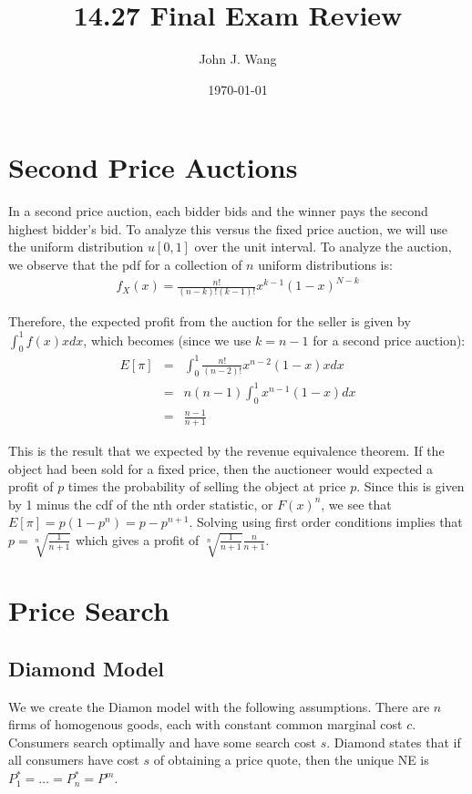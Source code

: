 \documentclass[12pt]{article}
\title{14.27 Final Exam Review}
\author{John J. Wang}
\date{\today}
\begin{document}
\maketitle

\section{Second Price Auctions}

In a second price auction, each bidder bids and the winner pays the second highest bidder's bid. To analyze this versus the fixed price auction, we will use the uniform distribution $u[0,1]$ over the unit interval. To analyze the auction, we observe that the pdf for a collection of $n$ uniform distributions is:
\begin{eqnarray}
f_X(x) = \frac{n!}{(n-k)! (k-1)!} x^{k-1} (1-x)^{N-k}
\end{eqnarray}

Therefore, the expected profit from the auction for the seller is given by $\int_0^1 f(x) x dx$, which becomes (since we use $k = n-1$ for a second price auction):
\begin{eqnarray}
E[\pi] &=& \int_0^1 \frac{n!}{(n-2)!} x^{n-2} (1-x) x dx \\
&=& n(n-1) \int_0^1 x^{n-1} (1-x) dx \\
&=& \frac{n-1}{n+1}
\end{eqnarray}

This is the result that we expected by the revenue equivalence theorem. If the object had been sold for a fixed price, then the auctioneer would expected a profit of $p$ times the probability of selling the object at price $p$. Since this is given by 1 minus the cdf of the nth order statistic, or $F(x)^n$, we see that $E[\pi] = p (1 - p^n) = p - p^{n+1}$. Solving using first order conditions implies that $p = \sqrt[n]{\frac{1}{n+1}}$ which gives a profit of $\sqrt[n]{\frac{1}{n+1}} \frac{n}{n+1}$. 

\section{Price Search}

\subsection{Diamond Model}

We we create the Diamon model with the following assumptions. There are $n$ firms of homogenous goods, each with constant common marginal cost $c$. Consumers search optimally and have some search cost $s$. Diamond states that if all consumers have cost $s$ of obtaining a price quote, then the unique NE is $P_1^* = \ldots = P_n^* = P^m$. 
\end{document}
